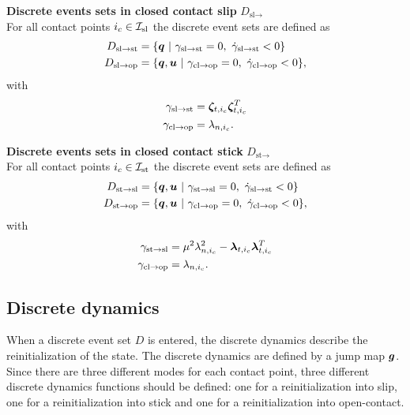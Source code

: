 \documentclass[../DC2017114Bouma.tex]{subfiles}
\begin{document}
\textbf{Discrete events sets in closed contact slip} $D_{\text{sl}\rightarrow}$\\
For all contact points $i_c\in\mathcal{I}_{\text{sl}}$ the discrete event sets are defined as
\begin{align}
D_{\text{sl}\rightarrow\text{st}} &= \{ \qb\ |\ \gamma_{\text{sl}\rightarrow\text{st}} = 0,\ \dot{\gamma}_{\text{sl}\rightarrow\text{st}} < 0\}\\
D_{\text{sl}\rightarrow\text{op}} &= \{ \qb,\ub\ |\ \gamma_{\text{cl}\rightarrow\text{op}} = 0,\ \dot{\gamma}_{\text{cl}\rightarrow\text{op}} < 0\},
\end{align}
with 
\begin{align}
\gamma_{\text{sl}\rightarrow\text{st}} &= \boldsymbol{\zeta}_{t,i_c}\boldsymbol{\zeta}_{t,i_c}^T\\
\gamma_{\text{cl}\rightarrow\text{op}} &= \lambda_{n,i_c}.
\end{align}

\textbf{Discrete events sets in closed contact stick} $D_{\text{st}\rightarrow}$\\
For all contact points $i_c\in\mathcal{I}_{\text{st}}$ the discrete event sets are defined as
\begin{align}
D_{\text{st}\rightarrow\text{sl}} &= \{ \qb,\ub\ |\ \gamma_{\text{st}\rightarrow\text{sl}} = 0,\ \dot{\gamma}_{\text{sl}\rightarrow\text{st}} < 0\}\\
D_{\text{st}\rightarrow\text{op}} &= \{ \qb,\ub\ |\ \gamma_{\text{cl}\rightarrow\text{op}} = 0,\ \dot{\gamma}_{\text{cl}\rightarrow\text{op}} < 0\},
\end{align}
with 
\begin{align}
\gamma_{\text{st}\rightarrow\text{sl}} &= \mu^2\lambda_{n,i_c}^2-\boldsymbol{\lambda}_{t,i_c}\boldsymbol{\lambda}_{t,i_c}^T\\
\gamma_{\text{cl}\rightarrow\text{op}} &= \lambda_{n,i_c}.
\end{align}

\subsection{Discrete dynamics}\label{sec:2discdyn}
When a discrete event set $D$ is entered, the discrete dynamics describe the reinitialization of the state. The discrete dynamics are defined by a jump map ${\boldsymbol{g}}$. Since there are three different modes for each contact point, three different discrete dynamics functions should be defined: one for a reinitialization into slip, one for a reinitialization into stick and one for a reinitialization into open-contact.
\end{document}
